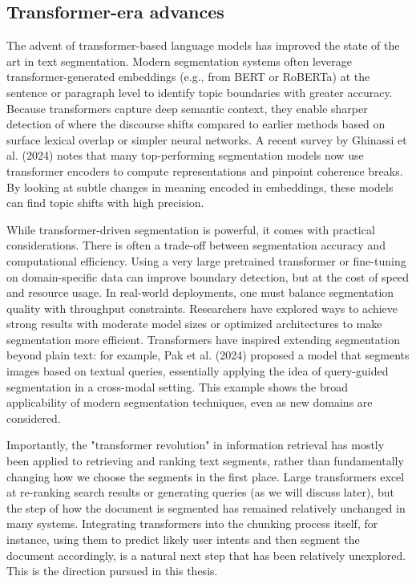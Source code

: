 \documentclass[12pt,a4paper]{report}
\begin{document}
\subsection{Transformer-era advances}

The advent of transformer-based language models has improved the state of the art in text segmentation. Modern segmentation systems often leverage transformer-generated embeddings (e.g., from BERT or RoBERTa) at the sentence or paragraph level to identify topic boundaries with greater accuracy. Because transformers capture deep semantic context, they enable sharper detection of where the discourse shifts compared to earlier methods based on surface lexical overlap or simpler neural networks. A recent survey by Ghinassi et al. (2024) notes that many top-performing segmentation models now use transformer encoders to compute representations and pinpoint coherence breaks. By looking at subtle changes in meaning encoded in embeddings, these models can find topic shifts with high precision.

While transformer-driven segmentation is powerful, it comes with practical considerations. There is often a trade-off between segmentation accuracy and computational efficiency. Using a very large pretrained transformer or fine-tuning on domain-specific data can improve boundary detection, but at the cost of speed and resource usage. In real-world deployments, one must balance segmentation quality with throughput constraints. Researchers have explored ways to achieve strong results with moderate model sizes or optimized architectures to make segmentation more efficient. Transformers have inspired extending segmentation beyond plain text: for example, Pak et al. (2024) proposed a model that segments images based on textual queries, essentially applying the idea of query-guided segmentation in a cross-modal setting. This example shows the broad applicability of modern segmentation techniques, even as new domains are considered.

Importantly, the "transformer revolution" in information retrieval has mostly been applied to retrieving and ranking text segments, rather than fundamentally changing how we choose the segments in the first place. Large transformers excel at re-ranking search results or generating queries (as we will discuss later), but the step of how the document is segmented has remained relatively unchanged in many systems. Integrating transformers into the chunking process itself, for instance, using them to predict likely user intents and then segment the document accordingly, is a natural next step that has been relatively unexplored. This is the direction pursued in this thesis.
\end{document}
